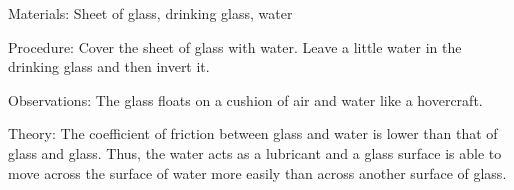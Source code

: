 \begin{multicols}{2}
\begin{description*}
\item[Materials:]{Sheet of glass, drinking glass, water}
\item[Procedure:]{Cover the sheet of glass with water. Leave a little water in the drinking glass and then invert it.}
\item[Observations:]{The glass floats on a cushion of air and water like a hovercraft.}
\item[Theory:]{The coefficient of friction between glass and water is lower than that of glass and glass. Thus, the water acts as a lubricant and a glass surface is able to move across the surface of water more easily than across another surface of glass.}
\end{description*}



\end{multicols}

\pagebreak